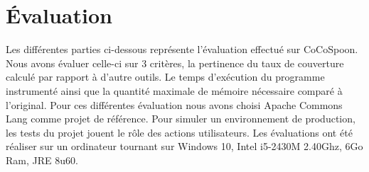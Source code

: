 \chapter{Évaluation}
	\thispagestyle{document}

Les différentes parties ci-dessous représente l'évaluation effectué sur CoCoSpoon. Nous avons évaluer celle-ci sur 3 critères, la pertinence du taux de couverture calculé par rapport à d'autre outils. Le temps d'exécution du programme instrumenté ainsi que la quantité maximale de mémoire nécessaire comparé à l'original. Pour ces différentes évaluation nous avons choisi Apache Commons Lang comme projet de référence. Pour simuler un environnement de production, les tests du projet jouent le rôle des actions utilisateurs. Les évaluations ont été réaliser sur un ordinateur tournant sur Windows 10, Intel i5-2430M 2.40Ghz, 6Go Ram, JRE 8u60.
	
		
		
		
		